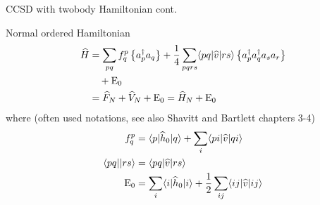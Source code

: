 \begin{frame}{CCSD with twobody Hamiltonian cont.}

    \begin{block}{Normal ordered Hamiltonian}
        \begin{align*}
            \widehat{H} &= \sum_{pq} f_q^p\left\{ a_p^\dagger a_q \right\} + 
                \frac{1}{4} \sum_{pqrs} \langle pq|\widehat{v} |rs\rangle \left\{ a_p^\dagger a_q^\dagger a_s a_r \right\} \\
                & \quad + \mathrm{E}_0 \\
                &= \widehat{F}_N + \widehat{V}_N  + \mathrm{E}_0 
                = \widehat{H}_N  + \mathrm{E}_0
        \end{align*}
        where (often used notations, see also Shavitt and Bartlett chapters 3-4)
        \begin{align*}
            f_q^p &= \langle p| \widehat{h}_0 |q\rangle + \sum_i \langle pi| \widehat{v} |qi\rangle \\
            \langle pq| |rs\rangle &= \langle pq| \widehat{v} |rs\rangle \\
            \mathrm{E}_0 &= \sum_i \langle i| \widehat{h}_0 |i\rangle + \frac{1}{2} \sum_{ij} \langle ij| \widehat{v} |ij\rangle
        \end{align*}
    \end{block}

\end{frame}

    
